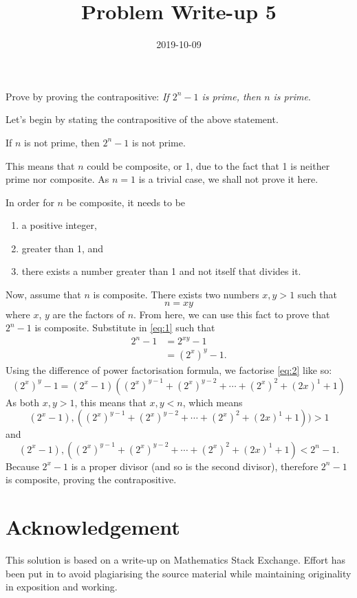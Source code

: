 \documentclass[a4paper,12pt]{article}
\title{Problem Write-up 5}
\date{2019-10-09}
\begin{document}
	\begin{problem}
		Prove by proving the contrapositive: \textit{If \(2^n - 1\) is prime, then \(n\) is prime}.
	\end{problem}
	\begin{answer}
		Let's begin by stating the contrapositive of the above statement.
		\begin{indcontrapositive}
			If \(n\) is not prime, then \(2^n - 1\) is not prime.
		\end{indcontrapositive}
		This means that \(n\) could be composite, or 1, due to the fact that 1 is neither prime nor composite. As \(n = 1\) is a trivial case, we shall not prove it here.
		
		In order for \(n\) be composite, it needs to be
		\begin{enumerate}[1.]
			\item a positive integer,
			\item greater than 1, and
			\item there exists a number greater than 1 and not itself that divides it.
		\end{enumerate}
		Now, assume that \(n\) is composite. There exists two numbers \(x,y > 1\) such that 
		\begin{equation} \label{eq:1}
			n = xy
		\end{equation}
		where \(x\), \(y\) are the factors of \(n\). From here, we can use this fact to prove that \(2^n - 1\) is composite. Substitute in \eqref{eq:1} such that
		\begin{align} \label{eq:2}
			2^n - 1 &= 2^{xy} - 1 \nonumber \\
			&= (2^x)^y - 1.
		\end{align}
		Using the difference of power factorisation formula, we factorise \eqref{eq:2} like so:
		\begin{equation}
			(2^x)^y - 1 = (2^x - 1)((2^x)^{y - 1} + (2^x)^{y - 2} + \dotsb + (2^x)^2 + (2x)^1 + 1)
		\end{equation}
		As both \(x,y > 1\), this means that \(x,y < n\), which means \[(2^x - 1),((2^x)^{y - 1} + (2^x)^{y - 2} + \dotsb + (2^x)^2 + (2x)^1 + 1)) > 1\] and \[(2^x - 1),((2^x)^{y - 1} + (2^x)^{y - 2} + \dotsb + (2^x)^2 + (2x)^1 + 1) < 2^n - 1.\] Because \(2^x - 1\) is a proper divisor (and so is the second divisor), therefore \(2^n - 1\) is composite, proving the contrapositive.
	\end{answer}
	\section*{Acknowledgement}
	This solution is based on a write-up on Mathematics Stack Exchange.\cite{496418} Effort has been put in to avoid plagiarising the source material while maintaining originality in exposition and working.
	
	\printbibliography
\end{document}
